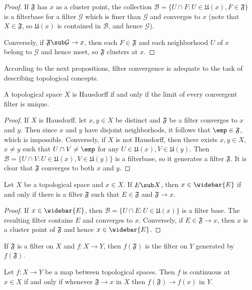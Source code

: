 \begin{proof}
If $\mathfrak{F}$ has $x$ as a cluster point, the collection $\mathcal{B}=\{U\cap F:U\in\mathfrak{U}(x),F\in\mathfrak{F}\}$ is a filterbase for a filter $\mathcal{G}$ which is finer than $\mathcal{G}$ and converges to $x$ (note that $X\in\mathfrak{F}$, so $\mathfrak{U}(x)$ is contained in $\mathcal{B}$, and hence $\mathcal{G}$).\par
Conversely, if $\mathfrak{F}\sub\mathcal{G}\to x$, then each $F\in\mathfrak{F}$ and each neighborhood $U$ of $x$ belong to $\mathcal{G}$ and hence meet, so $\mathfrak{F}$ clusters at $x$.
\end{proof}
According to the next propositions, filter convergence is adequate to the task of describing topological concepts.
\begin{proposition}\label{Hausdorff iff filter converge unique}
A topological space $X$ is Hausdorff if and only if the limit of every convergent filter is unique.
\end{proposition}
\begin{proof}
If $X$ is Hausdorff. let $x,y\in X$ be distinct and $\mathfrak{F}$ be a filter converges to $x$ and $y$. Then since $x$ and $y$ have disjoint neighborhods, it follows that $\emp\in\mathfrak{F}$, which is impossible. Conversely, if $X$ is not Hausdorff, then there exists $x,y\in X$, $x\neq y$ such that $U\cap V\neq\emp$ for any $U\in\mathfrak{U}(x),V\in\mathfrak{U}(y)$. Then $\mathcal{B}=\{U\cap V:U\in\mathfrak{U}(x),V\in\mathfrak{U}(y)\}$ is a filterbase, so it generates a filter $\mathfrak{F}$. It is clear that $\mathfrak{F}$ converges to both $x$ and $y$. 
\end{proof}
\begin{proposition}\label{closure iff filter converge}
Let $X$ be a topological space and $x\in X$. If $E\sub X$, then $x\in\widebar{E}$ if and only if there is a filter $\mathfrak{F}$ such that $E\in\mathfrak{F}$ and $\mathfrak{F}\to x$.
\end{proposition}
\begin{proof}
If $x\in\widebar{E}$, then $\mathcal{B}=\{U\cap E:U\in\mathfrak{U}(x)\}$ is a filter base. The resulting filter contains $E$ and converges to $x$. Conversely, if $E\in\mathfrak{F}\to x$, then $x$ is a cluster point of $\mathfrak{F}$ and hence $x\in\widebar{E}$.
\end{proof}
If $\mathfrak{F}$ is a filter on $X$ and $f:X\to Y$, then $f(\mathfrak{F})$ is the filter on $Y$ generated by $f(\mathfrak{F})$.
\begin{proposition}\label{continuous map iff filter}
Let $f:X\to Y$ be a map between topological spaces. Then $f$ is continuous at $x\in X$ if and only if whenever $\mathfrak{F}\to x$ in $X$ then $f(\mathfrak{F})\to f(x)$ in $Y$.
\end{proposition}
